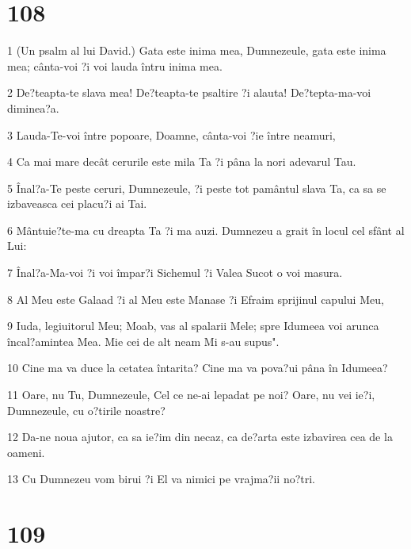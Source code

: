 \chapter{108}

\par 1 (Un psalm al lui David.) Gata este inima mea, Dumnezeule, gata este inima mea; cânta-voi ?i voi lauda întru inima mea.
\par 2 De?teapta-te slava mea! De?teapta-te psaltire ?i alauta! De?tepta-ma-voi diminea?a.
\par 3 Lauda-Te-voi între popoare, Doamne, cânta-voi ?ie între neamuri,
\par 4 Ca mai mare decât cerurile este mila Ta ?i pâna la nori adevarul Tau.
\par 5 Înal?a-Te peste ceruri, Dumnezeule, ?i peste tot pamântul slava Ta, ca sa se izbaveasca cei placu?i ai Tai.
\par 6 Mântuie?te-ma cu dreapta Ta ?i ma auzi. Dumnezeu a grait în locul cel sfânt al Lui:
\par 7 Înal?a-Ma-voi ?i voi împar?i Sichemul ?i Valea Sucot o voi masura.
\par 8 Al Meu este Galaad ?i al Meu este Manase ?i Efraim sprijinul capului Meu,
\par 9 Iuda, legiuitorul Meu; Moab, vas al spalarii Mele; spre Idumeea voi arunca încal?amintea Mea. Mie cei de alt neam Mi s-au supus".
\par 10 Cine ma va duce la cetatea întarita? Cine ma va pova?ui pâna în Idumeea?
\par 11 Oare, nu Tu, Dumnezeule, Cel ce ne-ai lepadat pe noi? Oare, nu vei ie?i, Dumnezeule, cu o?tirile noastre?
\par 12 Da-ne noua ajutor, ca sa ie?im din necaz, ca de?arta este izbavirea cea de la oameni.
\par 13 Cu Dumnezeu vom birui ?i El va nimici pe vrajma?ii no?tri.

\chapter{109}

